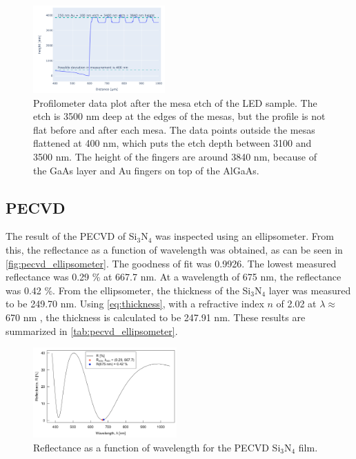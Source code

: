 \begin{figure}[ht]
    \centering
    \includegraphics[width=0.45\textwidth]{figures/LED_AlGaAs_3100nm_etch.png}
    \caption{
        Profilometer data plot after the mesa etch of the LED sample.
        The etch is 3500 nm deep at the edges of the mesas, but the profile is not flat before and after each mesa. 
        The data points outside the mesas flattened at 400 nm, which puts the etch depth between 3100 and 3500 nm.
        The height of the fingers are around 3840 nm, because of the GaAs layer and Au fingers on top of the AlGaAs.
    }
    \label{fig:profilometer_AlGaAs_3500nm_etch}
\end{figure}

\subsection{PECVD}

\noindent The result of the PECVD of Si$_3$N$_4$ was inspected using an ellipsometer.
From this, the reflectance as a function of wavelength was obtained, as can be seen in \autoref{fig:pecvd_ellipsometer}.
The goodness of fit was 0.9926.
The lowest measured reflectance was 0.29 \% at 667.7 nm. 
At a wavelength of 675 nm, the reflectance was 0.42 \%.
From the ellipsometer, the thickness of the Si$_3$N$_4$ layer was measured to be 249.70 nm.
Using \autoref{eq:thickness}, with a refractive index $n$ of 2.02 at $\lambda \approx$ 670 nm \cite{ref_index_Si3N4}, the thickness is calculated to be 247.91 nm. 
These results are summarized in \autoref{tab:pecvd_ellipsometer}.

\begin{figure}
    \centering
    \includegraphics[width=0.49\textwidth]{figures/PECVD_elips.png}
    \caption{Reflectance as a function of wavelength for the PECVD Si$_3$N$_4$ film.}
    \label{fig:pecvd_ellipsometer}
\end{figure}

